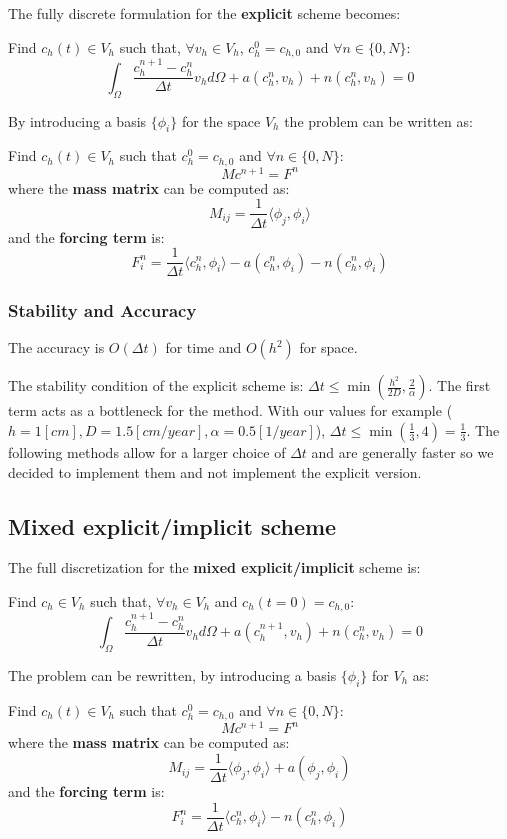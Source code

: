 \documentclass[12pt, letterpaper]{article}
\begin{document}
The fully discrete formulation for the \textbf{explicit} scheme becomes:

\vspace{1em}
\noindent
Find $c_h(t)\in V_h$ such that, $\forall v_h\in V_h$, $c_h^0=c_{h,0}$ and $\forall n\in\{0, N\}$:
$$\int_\Omega\frac{c_h^{n+1}-c_h^n}{\Delta t}v_hd\Omega+a(c_h^n,v_h)+n(c_h^n,v_h)=0$$

\noindent By introducing a basis $\{\phi_i\}$ for the space $V_h$ the problem can be written as:

\vspace{1em}
\noindent
Find $c_h(t)\in V_h$ such that $c_h^0=c_{h,0}$ and $\forall n\in\{0, N\}$:
$$Mc^{n+1}=F^n$$
where the \textbf{mass matrix} can be computed as:
$$M_{ij}=\frac1{\Delta t}\langle\phi_j,\phi_i\rangle$$
and the \textbf{forcing term} is:
$$F_i^n=\frac1{\Delta t}\langle c_h^n,\phi_i\rangle-a(c_h^n,\phi_i)-n(c_h^n,\phi_i)$$

\subsubsection{Stability and Accuracy}
The accuracy is $O(\Delta t)$ for time and $O(h^2)$ for space.

\noindent The stability condition of the explicit scheme is: $\Delta t\leq\min(\frac{h^2}{2D}, \frac2\alpha)$. The first term acts as a bottleneck for the method. With our values for example ($h=1[cm], D=1.5[cm/year], \alpha=0.5[1/year]$), $\Delta t\leq\min(\frac13, 4)=\frac13$. The following methods allow for a larger choice of $\Delta t$ and are generally faster so we decided to implement them and not implement the explicit version.

\subsection{Mixed explicit/implicit scheme}
The full discretization for the \textbf{mixed explicit/implicit} scheme is:

\vspace{1em}
\noindent
Find $c_h\in V_h$ such that, $\forall v_h\in V_h$ and $c_h(t=0)=c_{h,0}$:
$$\int_\Omega\frac{c_h^{n+1}-c_h^n}{\Delta t}v_hd\Omega+a(c_h^{n+1},v_h)+n(c_h^n,v_h)=0$$

\noindent The problem can be rewritten, by introducing a basis $\{\phi_i\}$ for $V_h$ as:

\vspace{1em}
\noindent
Find $c_h(t)\in V_h$ such that $c_h^0=c_{h,0}$ and $\forall n\in\{0, N\}$:
$$Mc^{n+1}=F^n$$
where the \textbf{mass matrix} can be computed as:
$$M_{ij}=\frac1{\Delta t}\langle\phi_j,\phi_i\rangle+a(\phi_j,\phi_i)$$
and the \textbf{forcing term} is:
$$F_i^n=\frac1{\Delta t}\langle c_h^n,\phi_i\rangle-n(c_h^n,\phi_i)$$
\end{document}
